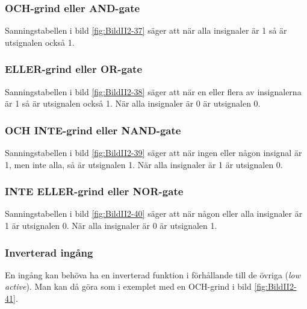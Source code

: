 \subsubsection{OCH-grind eller AND-gate}


Sanningstabellen i bild \ref{fig:BildII2-37} säger att när alla insignaler
är 1 så är utsignalen också 1.

\subsubsection{ELLER-grind eller OR-gate}


Sanningstabellen i bild \ref{fig:BildII2-38} säger att när en eller
flera av insignalerna är 1 så är utsignalen också 1. När alla
insignaler är 0 är utsignalen 0.

\subsubsection{OCH INTE-grind eller NAND-gate}


Sanningstabellen i bild \ref{fig:BildII2-39} säger att när ingen eller
någon insignal är 1, men inte alla, så är utsignalen 1. När alla
insignaler är 1 är utsignalen 0.

\subsubsection{INTE ELLER-grind eller NOR-gate}


Sanningstabellen i bild \ref{fig:BildII2-40} säger att när någon eller alla
insignaler är 1 är utsignalen 0.
När alla insignaler är 0 är utsignalen 1.

\subsubsection{Inverterad ingång}

En ingång kan behöva ha en inverterad funktion i förhållande till de
övriga (\emph{low active}). Man kan då göra som i exemplet med en
OCH-grind i bild \ref{fig:BildII2-41}.


